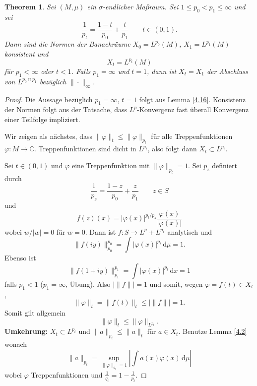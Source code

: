 \documentclass[
paper=a4,
bibtotocnumbered,
liststotocnumbered,
tablecaptionabove,
pointlessnumbers,
twoside,
openright,
10pt
]
{report}
\let\phi\varphi
\newtheorem{thm}{Theorem}[chapter]
\theoremstyle{definition}
\numberwithin{equation}{chapter}
\begin{document}
\begin{thm}\label{4.19}
Sei $(M,\mu)$ ein $\sigma$-endlicher Maßraum. Sei $1\le p_0 < p_1 \le \infty$ und sei 
\begin{equation}
\frac{1}{p_t} = \frac{1-t}{p_0} + \frac{t}{p_1} \qquad t\in (0,1).
\end{equation}
Dann sind die Normen der Banachräume $X_0= L^{p_0}(M)$, $X_1 = L^{p_1} (M)$ konsistent und
\begin{equation}
X_t = L^{p_t} (M)
\end{equation}
für $p_1<\infty$ oder $t<1$. Falls $p_1=\infty$ und $t=1$, dann ist $X_t = X_1$ der Abschluss von $L^{p_0 \cap p_1}$ bezüglich $\| \cdot \|_\infty$.
\end{thm}
\begin{proof}
Die Aussage bezüglich $p_1= \infty$, $t=1$ folgt aus Lemma \ref{4.16}.  Konsistenz der Normen folgt aus der Tatsache, dass $L^p$-Konvergenz fast überall Konvergenz einer Teilfolge impliziert.

Wir zeigen als nächstes, dass $\| \phi\|_{t}\le \| \phi\|_{p_t}$ für alle Treppenfunktionen $\phi: M\to \mathbb C$. Treppenfunktionen sind dicht in $L^{p_t}$, also folgt dann $X_t\subset L^{p_t}$.

Sei $t\in (0,1)$ und $\phi$ eine Treppenfunktion mit $\| \phi\|_{p_t} =1$. Sei $p_z$ definiert durch 
\begin{equation}
\frac{1}{p_z} = \frac{1-z}{p_0} + \frac{z}{p_1} \qquad z\in S
\end{equation}
und
\begin{equation}
f(z) (x) = |\phi(x)|^{p_t/p_z} \frac{\phi(x)}{|\phi(x)|}
\end{equation}
wobei $w/|w|=0$ für $w=0$. Dann ist $f: S \to L^p+ L^{p_1}$ analytisch und
\begin{equation}
\| f(iy)\|_{p_0}^{p_0} = \int |\phi(x)|^{p_t} \, \mathrm d\mu =1.
\end{equation}
Ebenso ist
\begin{equation}
\| f(1+iy)\|_{p_1}^{p_1} = \int |\phi(x)|^{p_t} \, \mathrm dx =1
\end{equation}
falls $p_1 <1$ ($p_1 = \infty$, Übung).  Also $|\| f\| |=1$ und somit,  wegen $\phi = f(t)\in X_t$, 
\begin{equation}
\| \phi\|_t = \| f(t)\|_t\le |\| f\| | =1.
\end{equation}
Somit gilt allgemein
\begin{equation}
\| \phi\|_t \le \| \phi\|_{L^{p_t}}.
\end{equation}
\textbf{Umkehrung:} $X_t\subset L^{p_t}$ und $\| a\|_{p_t} \le \| a\|_t$ für $a\in X_t$. Benutze Lemma \ref{4.2} wonach 
\begin{equation}
\| a \|_{p_t} = \sup_{\| \phi \|_{a_t} =1} \left | \int a(x) \phi(x) \, \mathrm d\mu \right |
\end{equation}
wobei $\phi$ Treppenfunktionen und $\frac{1}{q_t} = 1- \frac{1}{p_t}$.


\end{proof}
\end{document}
